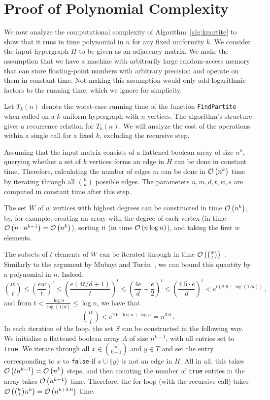 \section{Proof of Polynomial Complexity}\label{sec:complexity}

We now analyze the computational complexity of Algorithm~\ref{alg:kpartite} to show that it runs in time polynomial in $n$ for any fixed uniformity $k$.
We consider the input hypergraph $H$ to be given as an adjacency matrix.
We make the assumption that we have a machine with arbitrarily large random-access memory that can store
floating-point numbers with arbitrary precision and operate on them in constant time.
Not making this assumption would only add logarithmic factors to the running time, which we ignore for simplicity.

Let $T_k(n)$ denote the worst-case running time of the function \texttt{FindPartite} when called on a $k$-uniform hypergraph with $n$ vertices.
The algorithm's structure gives a recurrence relation for $T_k(n)$.
We will analyze the cost of the operations within a single call for a fixed $k$, excluding the recursive step.

Assuming that the input matrix consists of a flattened boolean array of size $n^k$,
querying whether a set of $k$ vertices forms an edge in $H$ can be done in constant time.
Therefore, calculating the number of edges $m$ can be done in $\mathcal{O}\left(n^k\right)$ time by iterating through all $\binom{n}{k}$ possible edges.
The parameters $n, m, d, t, w, s$ are computed in constant time after this step.

The set $W$ of $w$ vertices with highest degrees can be constructed in time $\mathcal{O}\left(n^k\right)$, by, for example,
creating an array with the degree of each vertex (in time  $\mathcal{O}\left(n \cdot n^{k-1}\right) = \mathcal{O}\left(n^k\right)$), sorting it (in time $\mathcal{O}\left(n \log n\right)$),
and taking the first $w$ elements.

The subsets of $t$ elements of $W$ can be iterated through in time $\mathcal{O}\left(\binom{w}{t}\right)$~\cite{reingold1977combinatorial}.
Similarly to the argument by Mubayi and Tur\'{a}n~\cite{MUBAYI2010174}, we can bound this quantity by a polynomial in $n$.
Indeed,
\[
    \binom{w}{t} \leq \left(\frac{ew}{t}\right)^t
    \leq \left(\frac{e(4t/d + 1)}{t}\right)^t
    \leq \left(\frac{4e}{d} + \frac{e}{2}  \right)^t
    \leq \left(\frac{4.5 \cdot e}{d}\right)^t < e^{t(2.6 + \log (1/d))}\,,
\]
and from $t  < \frac{\log n}{\log (1/d)} \leq \log n$, we have that
\[
    \binom{w}{t} < e^{2.6 \cdot \log n + \log n} = n^{3.6}\,.
\]
In each iteration of the loop, the set $S$ can be constructed in the following way.
We initialize a flattened boolean array $A$ of size $n^{k-1}$,
with all entries set to \texttt{true}.
We iterate through all $x \in \binom{[n]}{k-1}$ and $y \in T$
and set the entry corresponding to $x$ to \texttt{false} if $x \cup \{y\}$ is not an edge in $H$.
All in all, this takes $\mathcal{O}\left(tn^{k-1}\right) = \mathcal{O}\left(n^k\right)$ steps, and then counting the number of \texttt{true} entries in the array takes $\mathcal{O}\left(n^{k-1}\right)$ time.
Therefore, the for loop (with the recursive call) takes $\mathcal{O}\left(\binom{w}{t} n^{k}\right) = \mathcal{O}\left(n^{k+3.6}\right)$ time.

